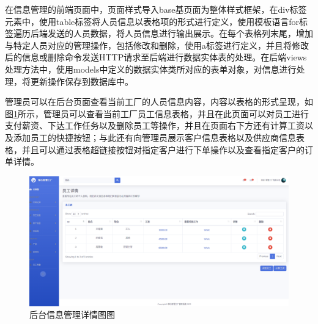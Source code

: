 在信息管理的前端页面中，页面样式导入base基页面为整体样式框架，在div标签元素中，使用table标签将人员信息以表格项的形式进行定义，使用模板语言for标签遍历后端发送的人员数据，将人员信息进行输出展示。在每个表格列末尾，增加与特定人员对应的管理操作，包括修改和删除，使用a标签进行定义，并且将修改后的信息或删除命令发送HTTP请求至后端进行数据实体表的处理。在后端views处理方法中，使用models中定义的数据实体类所对应的表单对象，对信息进行处理，将更新操作保存到数据库中。

管理员可以在后台页面查看当前工厂的人员信息内容，内容以表格的形式呈现，如图\ref{fig:bifmtdf}所示，管理员可以查看当前工厂员工信息表格，并且在此页面可以对员工进行支付薪资、下达工作任务以及删除员工等操作，并且在页面右下方还有计算工资以及添加员工的快捷按钮；与此还有向管理员展示客户信息表格以及供应商信息表格，并且可以通过表格超链接按钮对指定客户进行下单操作以及查看指定客户的订单详情。

\begin{figure}[H]
        \centering
        \includegraphics[width=.75\textwidth]{figures/5employeedetail.png}
    \caption{后台信息管理详情图图}
    \label{fig:bifmtdf}
\end{figure}

